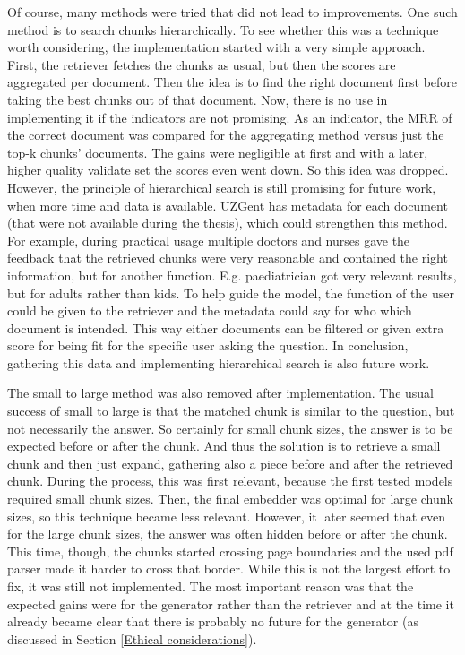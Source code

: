 Of course, many methods were tried that did not lead to improvements. One such method is to search chunks hierarchically. To see whether this was a technique worth considering, the implementation started with a very simple approach. First, the retriever fetches the chunks as usual, but then the scores are aggregated per document. Then the idea is to find the right document first before taking the best chunks out of that document. Now, there is no use in implementing it if the indicators are not promising. As an indicator, the MRR of the correct document was compared for the aggregating method versus just the top-k chunks' documents. The gains were negligible at first and with a later, higher quality validate set the scores even went down. So this idea was dropped. However, the principle of hierarchical search is still promising for future work, when more time and data is available. UZGent has metadata for each document (that were not available during the thesis), which could strengthen this method. For example, during practical usage multiple doctors and nurses gave the feedback that the retrieved chunks were very reasonable and contained the right information, but for another function. E.g. paediatrician got very relevant results, but for adults rather than kids. To help guide the model, the function of the user could be given to the retriever and the metadata could say for who which document is intended. This way either documents can be filtered or given extra score for being fit for the specific user asking the question. In conclusion, gathering this data and implementing hierarchical search is also future work.

The small to large method was also removed after implementation. The usual success of small to large is that the matched chunk is similar to the question, but not necessarily the answer. So certainly for small chunk sizes, the answer is to be expected before or after the chunk. And thus the solution is to retrieve a small chunk and then just expand, gathering also a piece before and after the retrieved chunk. During the process, this was first relevant, because the first tested models required small chunk sizes. Then, the final embedder was optimal for large chunk sizes, so this technique became less relevant. However, it later seemed that even for the large chunk sizes, the answer was often hidden before or after the chunk. This time, though, the chunks started crossing page boundaries and the used pdf parser made it harder to cross that border. While this is not the largest effort to fix, it was still not implemented. The most important reason was that the expected gains were for the generator rather than the retriever and at the time it already became clear that there is probably no future for the generator (as discussed in Section \ref{Ethical considerations}).

